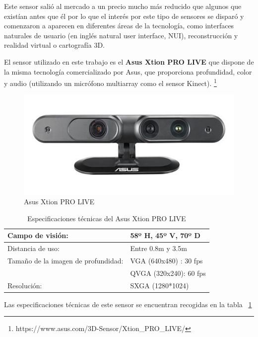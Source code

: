 Este sensor salió al mercado a un precio mucho más reducido que algunos que existían antes que él por lo que el interés por este tipo de sensores se disparó y comenzaron a aparecen en diferentes áreas de la tecnología, como interfaces naturales de usuario (en inglés natural user interface, NUI), reconstrucción y realidad virtual o cartografía 3D.

El sensor utilizado en este trabajo es el \textbf{Asus Xtion PRO LIVE} que dispone de la misma tecnología comercializado por Asus, que proporciona profundidad, color y audio (utilizando un micrófono multiarray como el sensor Kinect). \footnote{https://www.asus.com/3D-Sensor/Xtion\_PRO\_LIVE/}

\begin{figure}[th]
\centering
\includegraphics[scale=0.85]{Figures/xtion-pro-live.jpg}
\decoRule
\caption[Sensor Xtion]{Asus Xtion PRO LIVE}
\label{fig:Kinect}
\end{figure}


\begin{table}
\caption{Especificaciones técnicas del Asus Xtion PRO LIVE}
\label{tab:xtion}
\centering
\begin{tabular}{ l | l }
\toprule
Campo de visión: & 58º H, 45º V, 70º D\\
\hline
Distancia de uso: & Entre 0.8m y 3.5m\\
\hline
Tamaño de la imagen de profundidad: & VGA (640x480) : 30 fps \\
				& QVGA (320x240): 60 fps\\
\hline
Resolución: & SXGA (1280*1024) \\
\bottomrule
\end{tabular}
\end{table}

Las especificaciones técnicas de este sensor se encuentran recogidas en la tabla ~\ref{tab:xtion}

